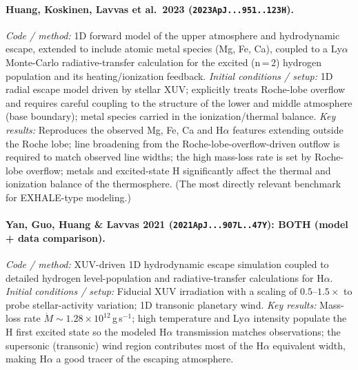 \paragraph{Huang, Koskinen, Lavvas et al.\ 2023 (\texttt{2023ApJ...951..123H}).}
\textit{Code / method:} 1D forward model of the upper atmosphere and
hydrodynamic escape, extended to include atomic metal species (Mg, Fe, Ca),
coupled to a Ly$\alpha$ Monte-Carlo radiative-transfer calculation for the
excited (n\,=\,2) hydrogen population and its heating/ionization feedback.
\textit{Initial conditions / setup:} 1D radial escape model driven by stellar
XUV; explicitly treats Roche-lobe overflow and requires careful coupling to
the structure of the lower and middle atmosphere (base boundary); metal species
carried in the ionization/thermal balance. \textit{Key results:} Reproduces the
observed Mg, Fe, Ca and H$\alpha$ features extending outside the Roche lobe;
line broadening from the Roche-lobe-overflow-driven outflow is required to
match observed line widths; the high mass-loss rate is set by Roche-lobe
overflow; metals and excited-state H significantly affect the thermal and
ionization balance of the thermosphere. (The most directly relevant benchmark
for EXHALE-type modeling.)

\paragraph{Yan, Guo, Huang \& Lavvas 2021 (\texttt{2021ApJ...907L..47Y}): BOTH (model + data comparison).}
\textit{Code / method:} XUV-driven 1D hydrodynamic escape simulation coupled to
detailed hydrogen level-population and radiative-transfer calculations for
H$\alpha$. \textit{Initial conditions / setup:} Fiducial XUV irradiation with a
scaling of $0.5$--$1.5\times$ to probe stellar-activity variation; 1D transonic
planetary wind. \textit{Key results:} Mass-loss rate $\dot{M}\sim1.28\times10^{12}$\,g\,s$^{-1}$;
high temperature and Ly$\alpha$ intensity populate the H first excited state so
the modeled H$\alpha$ transmission matches observations; the supersonic
(transonic) wind region contributes most of the H$\alpha$ equivalent width,
making H$\alpha$ a good tracer of the escaping atmosphere.

